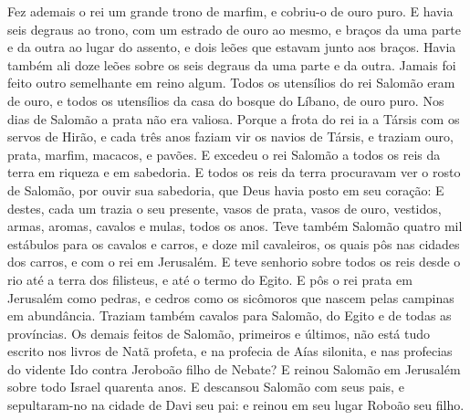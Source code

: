 {  Fez ademais o rei um grande trono de marfim, e cobriu-o de ouro puro.
  E havia seis degraus ao trono, com um estrado de ouro ao mesmo, e braços da uma parte e da outra ao lugar do assento, e dois leões que estavam junto aos braços.
  Havia também ali doze leões sobre os seis degraus da uma parte e da outra. Jamais foi feito outro semelhante em reino algum.
  Todos os utensílios do rei Salomão eram de ouro, e todos os utensílios da casa do bosque do Líbano, de ouro puro. Nos dias de Salomão a prata não era valiosa. %
  Porque a frota do rei ia a Társis com os servos de Hirão, e cada três anos faziam vir os navios de Társis, e traziam ouro, prata, marfim, macacos, e pavões.
  E excedeu o rei Salomão a todos os reis da terra em riqueza e em sabedoria.
  E todos os reis da terra procuravam ver o rosto de Salomão, por ouvir sua sabedoria, que Deus havia posto em seu coração:
  E destes, cada um trazia o seu presente, vasos de prata, vasos de ouro, vestidos, armas, aromas, cavalos e mulas, todos os anos.
  Teve também Salomão quatro mil estábulos para os cavalos e carros, e doze mil cavaleiros, os quais pôs nas cidades dos carros, e com o rei em Jerusalém.
  E teve senhorio sobre todos os reis desde o rio até a terra dos filisteus, e até o termo do Egito.
  E pôs o rei prata em Jerusalém como pedras, e cedros como os sicômoros que nascem pelas campinas em abundância.
  Traziam também cavalos para Salomão, do Egito e de todas as províncias.
  Os demais feitos de Salomão, primeiros e últimos, não está tudo escrito nos livros de Natã profeta, e na profecia de Aías silonita, e nas profecias do vidente Ido contra Jeroboão filho de Nebate?
  E reinou Salomão em Jerusalém sobre todo Israel quarenta anos.
  E descansou Salomão com seus pais, e sepultaram-no na cidade de Davi seu pai: e reinou em seu lugar Roboão seu filho.
\par }


